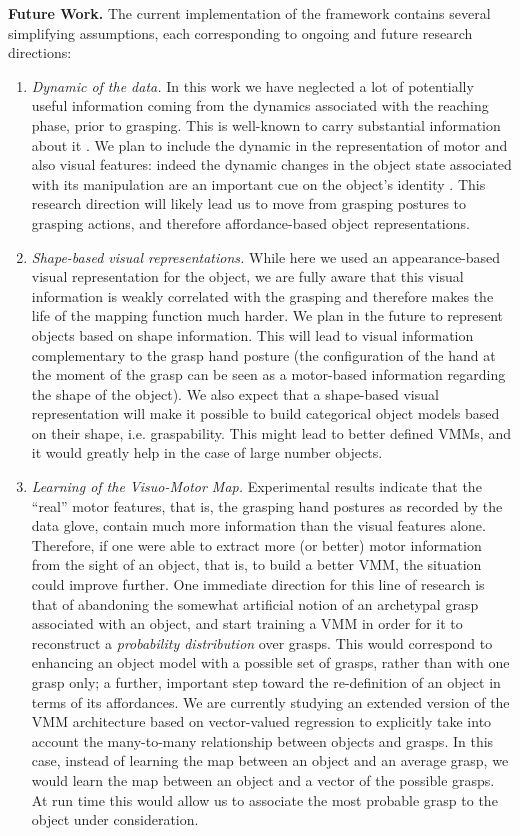 \noindent
{\bf Future Work.} The current implementation of the framework contains several simplifying assumptions, each corresponding to 
ongoing and future research directions:
\begin{enumerate}
\item {\em Dynamic of the data.}
In this work we have
neglected a lot of potentially useful information coming from the dynamics associated with the reaching phase, prior to grasping.
This is well-known
to carry substantial information about it \cite{174427,santello}. We plan to include the dynamic in the representation of motor and 
also visual features: indeed the dynamic changes in the object state associated with its manipulation are an important cue on the
object's identity \cite{gupta_davis_cvpr2008,kjellstrom_etal_eccv2008}. This research direction will likely lead us to move
from grasping postures to grasping actions, and therefore affordance-based object representations.

\item {\em Shape-based visual representations.}
While here we used an appearance-based visual representation for the object, we are fully aware that this visual information
is weakly correlated with the grasping and therefore makes the life of the mapping function much harder. We plan in the future to
represent objects based on shape information. This will lead to visual information complementary to the grasp hand posture (the
configuration of the hand at the moment of the grasp can be seen as a motor-based information regarding the shape of the object).
We also expect that a shape-based visual representation will make it possible to build categorical object models based on their
shape, i.e. graspability. This might lead to better defined VMMs, and it would greatly help in the case of large number
objects. 


\item {\em Learning of the Visuo-Motor Map.}
Experimental results  indicate that the ``real'' motor features, that is, the
grasping hand postures as recorded by the data glove, contain much more information
than the visual features alone. Therefore, if one were able to extract more (or better)
motor information from the sight of an object, that is, to build a better VMM,
the situation could improve further. One immediate direction for this line of research
is that of abandoning the somewhat artificial notion of an archetypal grasp associated
with an object, and start training a VMM in order for it to reconstruct a
\emph{probability distribution} over grasps. This would correspond to enhancing an
object model with a possible set of grasps, rather than with one grasp only; a
further, important step toward the re-definition of an object in terms of its
affordances.
We are currently studying an extended version of the VMM architecture based on vector-valued regression to explicitly take into account the many-to-many relationship between objects and grasps. In this case, instead of learning the map between an object and an average grasp, we would learn the map between an object and a vector of the possible grasps. At run time this would allow us to associate the most probable grasp to the object under consideration.


\end{enumerate}
